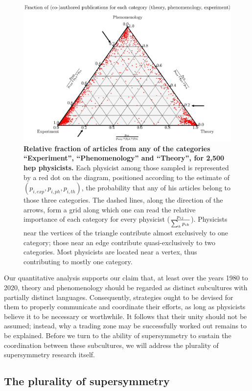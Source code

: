 \documentclass[smallextended]{svjour3}
\begin{document}
\begin{figure}
    \centering\includegraphics{Fig2.eps}
    \caption{\textbf{Relative fraction of articles from any of the categories ``Experiment'', ``Phenomenology'' and ``Theory'', for 2,500 \gls{hep} physicists.} Each physicist among those sampled is represented by a red dot on the diagram, positioned according to the estimate of $(p_{i,exp},p_{i,ph},p_{i,th})$, the probability that any of his articles belong to those three categories. The dashed lines, along the direction of the arrows, form a grid along which one can read the relative importance of each category for every physicist  ($p_{ij}\over \sum_{k}p_{ik}$). Physicists near the vertices of the triangle contribute almost exclusively to one category; those near an edge contribute quasi-exclusively to two categories. Most physicists are located near a vertex, thus contributing to mostly one category.}
    \label{fig:ternary_categories}
\end{figure}

Our quantitative analysis supports our claim that, at least over the years 1980 to 2020, theory and phenomenology should be regarded as distinct subcultures with partially distinct languages. Consequently, strategies ought to be devised for them to properly communicate and coordinate their efforts, as long as physicists believe it to be necessary or worthwhile. It follows that their unity should not be assumed; instead, why a trading zone may be successfully worked out remains to be explained. Before we turn to the ability of supersymmetry to sustain the coordination between these subcultures, we will address the plurality of supersymmetry research itself.

\subsection{The plurality of supersymmetry}
\label{section:application_plurality}
\end{document}
